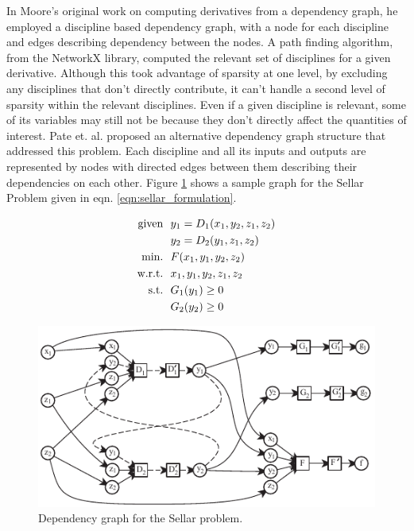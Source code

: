 \documentclass[]{aiaa-tc} %
\newcommand{\txt}{\textrm}
\begin{document}
    In Moore's original work on computing derivatives from a dependency graph, he employed
    a discipline based dependency graph, with a node for each discipline and edges describing
    dependency between the nodes. A path finding algorithm, from the NetworkX library\cite{hagberg-2008-exploring},
    computed the relevant set of disciplines for a given derivative. Although this took advantage of sparsity at
    one level, by excluding any disciplines that don't directly contribute, it can't handle a second level of sparsity
    within the relevant disciplines. Even if a given discipline is relevant, some of its variables may still not be
    because they don't directly affect the quantities of interest. Pate et. al. proposed an alternative dependency graph
    structure that addressed this problem\cite{graph_problem2013}. Each discipline and all its inputs and outputs are
    represented by nodes with directed edges between them describing their dependencies on each other.
    Figure \ref{fig:sellar_graph} shows a sample graph for the Sellar Problem \cite{AIAA:sellar}
    given in eqn. \ref{eqn:sellar_formulation}.

    \begin{align}
        \txt{given} & \ \ y_1 = D_1(x_1,y_2,z_1,z_2) \notag
        \\      & \ \ y_2 = D_2(y_1,z_1,z_2) \notag
        \\\txt{min.} &\ \ F(x_1,y_1,y_2,z_2) \notag
        \\\txt{w.r.t.} & \ \ x_1,y_1,y_2,z_1,z_2 \notag
        \\\txt{s.t.} & \ \ G_1(y_1) \geq 0 \notag
        \\     & \ \ G_2(y_2) \geq 0
        \label{eqn:sellar_formulation}
    \end{align}

    \begin{figure}[!htb]\begin{center}
      \includegraphics[width=.8\textwidth]{images/sellar_cycles}
      \caption{ Dependency graph for the Sellar problem. \label{fig:sellar_graph}}
    \end{center}\end{figure}
\end{document}
